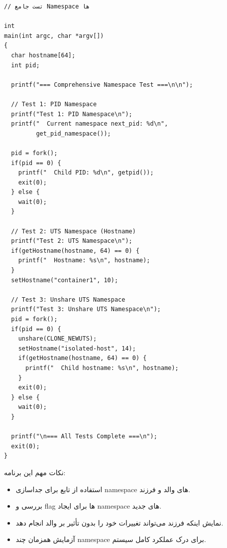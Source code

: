 \documentclass[12pt]{article}
\begin{document}
\begin{LTR}
\begin{lstlisting}
// تست جامع Namespace ها

int
main(int argc, char *argv[])
{
  char hostname[64];
  int pid;

  printf("=== Comprehensive Namespace Test ===\n\n");

  // Test 1: PID Namespace
  printf("Test 1: PID Namespace\n");
  printf("  Current namespace next_pid: %d\n", 
         get_pid_namespace());
  
  pid = fork();
  if(pid == 0) {
    printf("  Child PID: %d\n", getpid());
    exit(0);
  } else {
    wait(0);
  }

  // Test 2: UTS Namespace (Hostname)
  printf("Test 2: UTS Namespace\n");
  if(getHostname(hostname, 64) == 0) {
    printf("  Hostname: %s\n", hostname);
  }
  setHostname("container1", 10);

  // Test 3: Unshare UTS Namespace
  printf("Test 3: Unshare UTS Namespace\n");
  pid = fork();
  if(pid == 0) {
    unshare(CLONE_NEWUTS);
    setHostname("isolated-host", 14);
    if(getHostname(hostname, 64) == 0) {
      printf("  Child hostname: %s\n", hostname);
    }
    exit(0);
  } else {
    wait(0);
  }

  printf("\n=== All Tests Complete ===\n");
  exit(0);
}
\end{lstlisting}
\end{LTR}

نکات مهم این برنامه:
\begin{itemize}
\item استفاده از تابع \texttt{} برای جداسازی namespace های والد و فرزند.
\item بررسی \texttt{} و \texttt{} flag ها برای ایجاد namespace های جدید.
\item نمایش اینکه فرزند می‌تواند تغییرات خود را بدون تأثیر بر والد انجام دهد.
\item آزمایش همزمان چند namespace برای درک عملکرد کامل سیستم.
\end{itemize}
\end{document}
